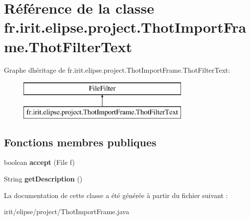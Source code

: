 \hypertarget{classfr_1_1irit_1_1elipse_1_1project_1_1_thot_import_frame_1_1_thot_filter_text}{}\section{Référence de la classe fr.\+irit.\+elipse.\+project.\+Thot\+Import\+Frame.\+Thot\+Filter\+Text}
\label{classfr_1_1irit_1_1elipse_1_1project_1_1_thot_import_frame_1_1_thot_filter_text}
Graphe d\textquotesingle{}héritage de fr.\+irit.\+elipse.\+project.\+Thot\+Import\+Frame.\+Thot\+Filter\+Text\+:\begin{figure}[H]
\begin{center}
\leavevmode
\includegraphics[height=2.000000cm]{classfr_1_1irit_1_1elipse_1_1project_1_1_thot_import_frame_1_1_thot_filter_text}
\end{center}
\end{figure}
\subsection*{Fonctions membres publiques}
\begin{DoxyCompactItemize}
\item 
\mbox{\label{classfr_1_1irit_1_1elipse_1_1project_1_1_thot_import_frame_1_1_thot_filter_text_a3d762fd017f7c319baab997cb501811b}} 
boolean {\bfseries accept} (File f)
\item 
\mbox{\label{classfr_1_1irit_1_1elipse_1_1project_1_1_thot_import_frame_1_1_thot_filter_text_a693676179c4ac26280b61b36de9cce9b}} 
String {\bfseries get\+Description} ()
\end{DoxyCompactItemize}


La documentation de cette classe a été générée à partir du fichier suivant \+:\begin{DoxyCompactItemize}
\item 
irit/elipse/project/Thot\+Import\+Frame.\+java\end{DoxyCompactItemize}
